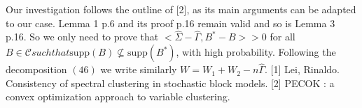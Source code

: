 Our investigation follows the outline of [2], as its main arguments can be adapted to our case. Lemma 1 p.6 and its proof p.16 remain valid and so is Lemma 3 p.16.
So we only need to prove that $<\widehat{\Sigma}-\widehat{\Gamma},B^*-B> >0$ for all $B \in \mathcal{C} such that \mbox{supp}(B)\nsubseteq \mbox{supp}(B^*) $, with high probability.
Following the decomposition $(46)$ we write similarly $W = W_1 + W_2 -n\widehat{\Gamma}$.
[1] Lei, Rinaldo. Consistency of spectral clustering in stochastic block models.
[2] PECOK : a convex optimization approach to variable clustering.

